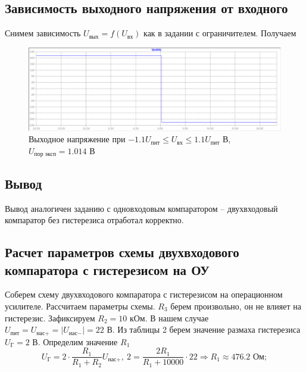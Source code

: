 \documentclass[a4paper, 12pt]{article}
\begin{document}
    \subsection{Зависимость выходного напряжения от входного}
    Снимем зависимость $U_\text{вых}=f\left( U_\text{вх} \right)$ как в задании с ограничителем.
    Получаем
    \begin{figure}[H]
        \centering
        \includegraphics[scale=0.46]{5task_fuin.png}
        \captionsetup{skip=0pt}
        \caption{Выходное напряжение при $-1.1U_\text{пит}\leq U_\text{вх}\leq 1.1U_\text{пит}$ В, $U_\text{пор эксп}=1.014$ В}
        \label{fig:5task_fuin}
    \end{figure}


    \subsection{Вывод}
    Вывод аналогичен заданию с одновходовым компаратором
    -- двухвходовый компаратор без гистерезиса
    отработал корректно.


    \subsection{Расчет параметров схемы двухвходового компаратора с гистерезисом на ОУ}
    Соберем схему двухвходового компаратора с гистерезисом на операционном
    усилителе. Рассчитаем параметры схемы. $R_3$ берем произвольно, он не
    влияет на гистерезис. Зафиксируем $R_2=10\text{ кОм}$. В нашем случае
    $U_\text{пит}=U_{\text{нас}+}=|U_{\text{нас}-}|=22$ В. Из
    таблицы 2 берем значение размаха гистерезиса $U_\text{Г}=2$ В. Определим значение $R_1$
    $$
    U_\text{Г}=2\cdot\dfrac{R_1}{R_1+R_2}U_{\text{нас}+},\ 2=\dfrac{2R_1}{R_1+10000}\cdot22\Rightarrow R_1\approx476.2\text{ Ом};
    $$
\end{document}
